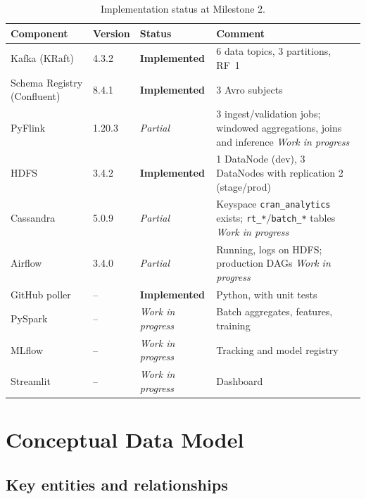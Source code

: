 \documentclass[11pt,a4paper]{article}
\newcommand{\done}{\textbf{Implemented}}
\newcommand{\planned}{\textit{Work in progress}}
\newcommand{\partialimpl}{\textit{Partial}}
\begin{document}
\begin{table}[H]
\centering
\caption{Implementation status at Milestone 2.}
\small
\begin{tabularx}{\textwidth}{@{}L{4.3cm}L{1.3cm}L{3.0cm}Y@{}}
\toprule
\textbf{Component} & \textbf{Version} & \textbf{Status} & \textbf{Comment} \\
\midrule
Kafka (KRaft) & 4.3.2 & \done & 6 data topics, 3 partitions, RF~1 \\
Schema Registry (Confluent) & 8.4.1 & \done & 3 Avro subjects \\
PyFlink & 1.20.3 & \partialimpl & 3 ingest/validation jobs; windowed aggregations, joins and inference \planned \\
HDFS & 3.4.2 & \done & 1 DataNode (dev), 3 DataNodes with replication 2 (stage/prod) \\
Cassandra & 5.0.9 & \partialimpl & Keyspace \texttt{cran\_\allowbreak{}analytics} exists; \texttt{rt\_\allowbreak{}*}/\texttt{batch\_\allowbreak{}*} tables \planned \\
Airflow & 3.4.0 & \partialimpl & Running, logs on HDFS; production DAGs \planned \\
GitHub poller & -- & \done & Python, with unit tests \\
PySpark & -- & \planned & Batch aggregates, features, training \\
MLflow & -- & \planned & Tracking and model registry \\
Streamlit & -- & \planned & Dashboard \\
\bottomrule
\end{tabularx}
\end{table}

\section{Conceptual Data Model}

\subsection{Key entities and relationships}
\end{document}
